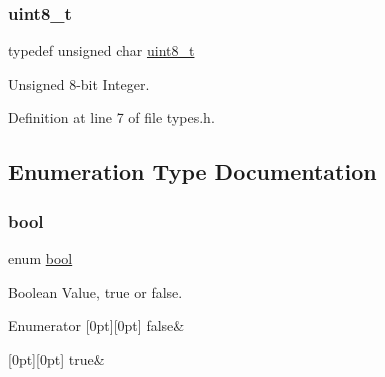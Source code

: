\subsubsection{\texorpdfstring{uint8\+\_\+t}{uint8\_t}}
{\footnotesize\ttfamily typedef unsigned char \hyperlink{a00032_aba7bc1797add20fe3efdf37ced1182c5_aba7bc1797add20fe3efdf37ced1182c5}{uint8\+\_\+t}}



Unsigned 8-\/bit Integer. 



Definition at line 7 of file types.\+h.



\subsection{Enumeration Type Documentation}
\mbox{\label{a00032_af6a258d8f3ee5206d682d799316314b1_af6a258d8f3ee5206d682d799316314b1}} 
\subsubsection{\texorpdfstring{bool}{bool}}
{\footnotesize\ttfamily enum \hyperlink{a00032_af6a258d8f3ee5206d682d799316314b1_af6a258d8f3ee5206d682d799316314b1}{bool}}



Boolean Value, true or false. 

\begin{DoxyEnumFields}{Enumerator}
[0pt][0pt]{}\mbox{\label{a00032_af6a258d8f3ee5206d682d799316314b1_af6a258d8f3ee5206d682d799316314b1ae9de385ef6fe9bf3360d1038396b884c}} 
false&\\
\hline

[0pt][0pt]{}\mbox{\label{a00032_af6a258d8f3ee5206d682d799316314b1_af6a258d8f3ee5206d682d799316314b1a08f175a5505a10b9ed657defeb050e4b}} 
true&\\
\hline

\end{DoxyEnumFields}


